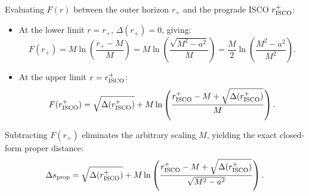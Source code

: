 Evaluating $F(r)$ between the outer horizon $r_+$ and the prograde ISCO $r_{\rm ISCO}^+$:
\begin{itemize}
    \item At the lower limit $r = r_+$, $\Delta(r_+) = 0$, giving:
    \begin{equation}
        F(r_+) = M \ln\left(\frac{r_+ - M}{M}\right) = M \ln\left(\frac{\sqrt{M^2 - a^2}}{M}\right) = \frac{M}{2} \ln\left(\frac{M^2 - a^2}{M^2}\right).
    \end{equation}
    \item At the upper limit $r = r_{\rm ISCO}^+$:
    \begin{equation}
        F(r_{\rm ISCO}^+) = \sqrt{\Delta(r_{\rm ISCO}^+)} + M \ln\left( \frac{r_{\rm ISCO}^+ - M + \sqrt{\Delta(r_{\rm ISCO}^+)}}{M} \right).
    \end{equation}
\end{itemize}
Subtracting $F(r_+)$ eliminates the arbitrary scaling $M$, yielding the exact closed-form proper distance:
\begin{equation}
    \Delta s_{\rm prop} = \sqrt{\Delta(r_{\rm ISCO}^+)} + M \ln\left( \frac{r_{\rm ISCO}^+ - M + \sqrt{\Delta(r_{\rm ISCO}^+)}}{\sqrt{M^2 - a^2}} \right).
    \label{eq:proper_distance_antiderivative}
\end{equation}

